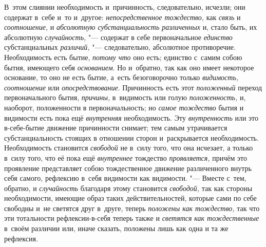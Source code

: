 \label{bkm:bm93a}В~этом слиянии необходимость и~причинность, следовательно,
исчезли; они содержат в~себе и~то и~другое:
{\em непосредственное тождество,} как
{\em связь} и {\em соотношение,} и
{\em абсолютную субстанциальность различенных} и, стало
быть, их абсолютную {\em случайность,} "--- содержат в
себе первоначальное {\em единство} субстанциальных
{\em различий,} "--- следовательно, абсолютное
противоречие. Необходимость есть бытие, {\em потому
что} оно есть; единство с~самим собою бытия, имеющего себя
{\em основанием}. Но и~обратно, так как оно имеет
некоторое основание, то оно не есть бытие, а~есть безоговорочно только
{\em видимость, соотношение} или
{\em опосредствование}. Причинность есть этот
{\em положенный} переход первоначального бытия,
{\em причины,} в~видимость или голую
{\em положенность,} и, наоборот, положенности в
первоначальность; но {\em самое тождество} бытия и
видимости есть пока ещё {\em внутренняя} необходимость.
Эту {\em внутренность} или это в-себе-бытие движение
причинности снимает; тем самым утрачивается субстанциальность стоящих в
отношении сторон и~раскрывается необходимость. Необходимость становится
{\em свободой} не в~силу того, что она исчезает, а
только в~силу того, что её пока ещё {\em внутреннее}
тождество {\em проявляется,} причём это проявление
представляет собою тождественное движение различенного внутрь себя самого,
рефлексию в~себя видимости как видимости. "--- Вместе с~тем, обратно, и
{\em случайность} благодаря этому становится
{\em свободой,} так как стороны необходимости, имеющие
образ таких действительностей, которые сами по себе свободны и~не светятся
друг в~друге, теперь {\em положены как тождество,} так
что эти тотальности рефлексии-в-себя теперь также и
{\em светятся} {\em как
тождественные} в~своём различии или, иначе сказать, положены лишь как одна
и та же рефлексия.

